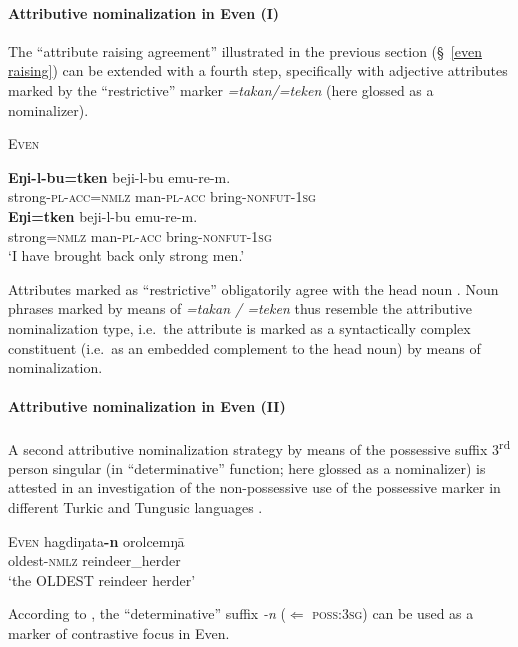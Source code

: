 \paragraph{Attributive nominalization in Even (I)}
The “attribute raising agreement” illustrated in the previous section (\S~\ref{even raising}) can be extended with a fourth step, specifically with adjective attributes marked by the “restrictive” marker \textit{=takan/=teken} (here glossed as a nominalizer).
\begin{exe}
\ex \textsc{Even} \cite[32]{malchukov1995}
\begin{xlist}
\ex 
\gll	\textbf{Eŋi-l-bu=tken} beji-l-bu emu-re-m.\\
	strong-\textsc{pl}-\textsc{acc}=\textsc{nmlz} man-\textsc{pl}-\textsc{acc} bring-\textsc{nonfut}-\textsc{1sg}\\
\ex	
\gll	* \textbf{Eŋi=tken} beji-l-bu emu-re-m.\\
	{} strong=\textsc{nmlz} man-\textsc{pl}-\textsc{acc} bring-\textsc{nonfut}-\textsc{1sg}\\
\glt	‘I have brought back only strong men.’
\end{xlist}
\end{exe}
Attributes marked as “restrictive” obligatorily agree with the head noun \cite[32]{malchukov1995}. Noun phrases marked by means of \textit{=takan / =teken} thus resemble the attributive nominalization type, i.e.~the attribute is marked as a syntactically complex constituent (i.e.~as an embedded complement to the head noun) by means of nominalization.

\paragraph{Attributive nominalization in Even (II)}
A second attributive nominalization strategy by means of the possessive suffix 3\textsuperscript{rd} person singular (in “determinative” function; here glossed as a nominalizer) is attested in an investigation of the non-possessive use of the possessive marker in different Turkic and Tungusic languages \citep{benzing1993b}.
\begin{exe}
\ex \textsc{Even} \cite[17–18 Footnote 58]{benzing1993b}
\gll	hagdiŋata\textbf{-n} orolcemŋā\\
	oldest-\textsc{nmlz} reindeer\_herder\\
\glt	‘the OLDEST reindeer herder’
\end{exe}
According to \citet[17–18 Footnote 58]{benzing1993b}, the “determinative” suffix {\it -n} ($\Leftarrow$ \textsc{poss:3sg}) can be used as a marker of contrastive focus in Even.

